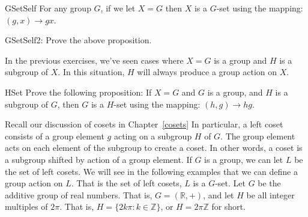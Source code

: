 \begin{prop}{GSetSelf} 
For any group $G$, if we let $X=G$ then $X$ is a $G$-set using the mapping: $(g, x) \rightarrow  gx$.
\end{prop}

\begin {exercise}{GSetSelf2}: 
Prove the above proposition.
\end {exercise}
In the previous exercises, we've seen cases where $X=G$ is a group and $H$ is a subgroup of $X$.  In this situation, $H$ will always produce a group action on $X$.

\begin{exercise}{HSet} 
Prove the following proposition:  If $X=G$ and $G$ is a group, and $H$ is a subgroup of $G$, then $G$ is a $H$-set using the mapping: $(h, g)\rightarrow hg$.
\end {exercise}

Recall our discussion of cosets in Chapter~\ref{cosets} In particular, a left coset consists of a group element $g$ acting on a subgroup $H$ of $G$. The group element acts on each element of the subgroup to create a coset. In other words, a coset is a subgroup shifted by action of a group element.  If $G$ is a group, we can let $L$ be the set of left cosets. We will see in the following examples that we can define a group action on $L$.  That is the set of left cosets, $L$ is a $G$-set.
Let $G$ be the additive group of real numbers.  That is, $G=(\mathbb{R},+)$, and let $H$ be all integer multiples of $2\pi$.   That is, $H=\{2k\pi:k\in \mathbb{Z}\}$, or $H = 2 \pi \mathbb{Z}$ for short.  

